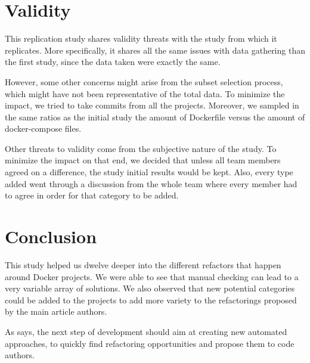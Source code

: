 \documentclass[lettersize,journal]{IEEEtran}
\begin{document}

\section{Validity}

This replication study shares validity threats with the study from \cite{ksontini_refactorings_2021} which it replicates.
More specifically, it shares all the same issues with data gathering than the first study, since the data taken were exactly the same.

However, some other concerns might arise from the subset selection process, which might have not been representative of the total data.
To minimize the impact, we tried to take commits from all the projects.
Moreover, we sampled in the same ratios as the initial study the amount of Dockerfile versus the amount of docker-compose files.

Other threats to validity come from the subjective nature of the study.
To minimize the impact on that end, we decided that unless all team members agreed on a difference, the study initial results would be kept.
Also, every type added went through a discussion from the whole team where every member had to agree in order for that category to be added.

\section{Conclusion}

This study helped us dwelve deeper into the different refactors that happen around Docker projects.
We were able to see that manual checking can lead to a very variable array of solutions.
We also observed that new potential categories could be added to the projects to add more variety to the refactorings proposed by the main article authors.

As \cite{ksontini_refactorings_2021} says, the next step of development should aim at creating new automated approaches, to quickly find refactoring opportunities and propose them to code authors.

{}


\vfill
\end{document}

